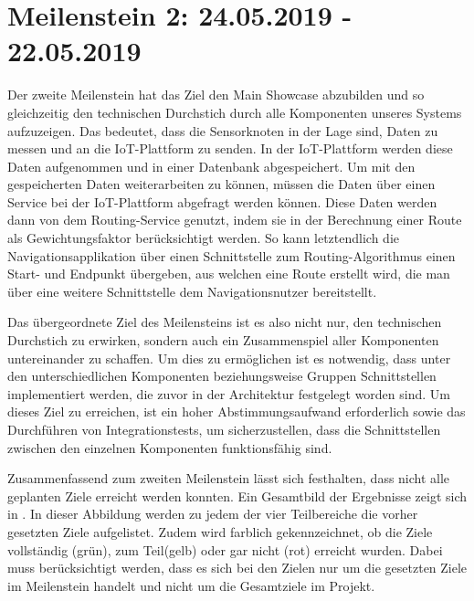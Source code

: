 \section{Meilenstein 2: 24.05.2019 - 22.05.2019}
Der zweite Meilenstein hat das Ziel den Main Showcase abzubilden und so gleichzeitig den technischen Durchstich durch alle Komponenten unseres Systems aufzuzeigen.
Das bedeutet, dass die Sensorknoten in der Lage sind, Daten zu messen und an die IoT-Plattform zu senden.
In der IoT-Plattform werden diese Daten aufgenommen und in einer Datenbank abgespeichert.
Um mit den gespeicherten Daten weiterarbeiten zu können, müssen die Daten über einen Service bei der IoT-Plattform abgefragt werden können.
Diese Daten werden dann von dem Routing-Service genutzt, indem sie in der Berechnung einer Route als Gewichtungsfaktor berücksichtigt werden.
So kann letztendlich die Navigationsapplikation über einen Schnittstelle zum Routing-Algorithmus einen Start- und Endpunkt übergeben, aus welchen eine Route erstellt wird, die man über eine weitere Schnittstelle dem Navigationsnutzer bereitstellt.

Das übergeordnete Ziel des Meilensteins ist es also nicht nur, den technischen Durchstich zu erwirken, sondern auch ein Zusammenspiel aller Komponenten untereinander zu schaffen.
Um dies zu ermöglichen ist es notwendig, dass unter den unterschiedlichen Komponenten beziehungsweise Gruppen Schnittstellen implementiert werden, die zuvor in der Architektur festgelegt worden sind.
Um dieses Ziel zu erreichen, ist ein hoher Abstimmungsaufwand erforderlich sowie das Durchführen von Integrationstests, um sicherzustellen, dass die Schnittstellen zwischen den einzelnen Komponenten funktionsfähig sind.


Zusammenfassend zum zweiten Meilenstein lässt sich festhalten, dass nicht alle geplanten Ziele erreicht werden konnten.
Ein Gesamtbild der Ergebnisse zeigt sich in .
In dieser Abbildung werden zu jedem der vier Teilbereiche die vorher gesetzten Ziele aufgelistet.
Zudem wird farblich gekennzeichnet, ob die Ziele vollständig (grün), zum Teil(gelb) oder gar nicht (rot) erreicht wurden.
Dabei muss berücksichtigt werden, dass es sich bei den Zielen nur um die gesetzten Ziele im Meilenstein handelt und nicht um die Gesamtziele im Projekt.

